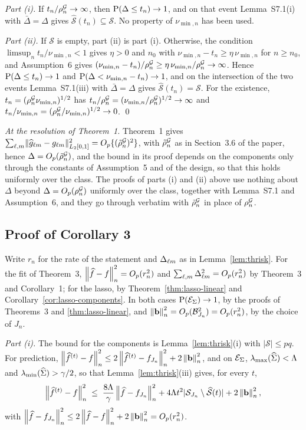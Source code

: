 \emph{Part (i).} If $t_n/\rho^{\mathcal{G}}_{n} \to \infty$, then $\mathrm{P}(\Delta \le t_n) \to 1$,
and on that event Lemma~S7.1(i) with $\bar{\Delta} = \Delta$ gives
$\widehat{\mathcal{S}}(t_n) \subseteq \mathcal{S}$. No property of
$\nu_{\min,n}$ has been used.

\emph{Part (ii).} If $\mathcal{S}$ is empty, part (ii) is part (i). Otherwise,
the condition $\limsup_n t_n/\nu_{\min,n} < 1$ gives $\eta > 0$ and $n_0$ with
$\nu_{\min,n} - t_n \ge \eta\,\nu_{\min,n}$ for $n \ge n_0$, and Assumption~6
gives $(\nu_{\min,n} - t_n)/\rho^{\mathcal{G}}_{n} \ge \eta\,\nu_{\min,n}/\rho^{\mathcal{G}}_{n} \to \infty$.
Hence $\mathrm{P}(\Delta \le t_n) \to 1$ and
$\mathrm{P}(\Delta < \nu_{\min,n} - t_n) \to 1$, and on the intersection of the two
events Lemma~S7.1(iii) with $\bar{\Delta} = \Delta$ gives
$\widehat{\mathcal{S}}(t_n) = \mathcal{S}$. For the existence,
$t_n = (\rho^{\mathcal{G}}_{n}\nu_{\min,n})^{1/2}$ has
$t_n/\rho^{\mathcal{G}}_{n} = (\nu_{\min,n}/\rho^{\mathcal{G}}_{n})^{1/2} \to \infty$ and
$t_n/\nu_{\min,n} = (\rho^{\mathcal{G}}_{n}/\nu_{\min,n})^{1/2} \to 0$. \qed

\emph{At the resolution of Theorem~1.} Theorem~1 gives
$\sum_{\ell,m}\lVert\widehat{g}_{\ell m}-g_{\ell m}\rVert^2_{L_2[0,1]}
= O_p\{(\tilde{\rho}^{\mathcal{G}}_{n})^{2}\}$, with $\tilde{\rho}^{\mathcal{G}}_{n}$ as in Section~3.6 of the paper, hence
$\Delta = O_p(\tilde{\rho}^{\mathcal{G}}_{n})$, and the bound in its proof depends on the components
only through the constants of Assumption~5 and of the design, so that this
holds uniformly over the class. The proofs of parts (i) and (ii) above use
nothing about $\Delta$ beyond $\Delta = O_p(\rho^{\mathcal{G}}_{n})$ uniformly over the class,
together with Lemma~S7.1 and Assumption~6, and they go through verbatim with
$\tilde{\rho}^{\mathcal{G}}_{n}$ in place of $\rho^{\mathcal{G}}_{n}$.

\subsection*{Proof of Corollary 3}

Write $r_n$ for the rate of the statement and $\Delta_{\ell m}$ as in
Lemma~\ref{lem:thrisk}. For the fit of Theorem~3,
$\left\lVert \widehat{f}-f \right\rVert_{n}^{2} = O_p(r_n^{2})$ and
$\sum_{\ell,m}\Delta_{\ell m}^{2} = O_p(r_n^{2})$ by Theorem~3 and Corollary~1; for the
lasso, by Theorem~\ref{thm:lasso-linear} and
Corollary~\ref{cor:lasso-components}. In both cases
$\mathrm{P}(\mathcal{E}_{\Sigma}) \to 1$, by the proofs of Theorems~3 and \ref{thm:lasso-linear},
and $\left\lVert \mathbf{b} \right\rVert_{n}^{2} = O_p(\mathcal{B}_{J_n}^{2}) = O_p(r_n^{2})$, by the choice
of $J_n$.

\emph{Part (i).} The bound for the components is Lemma~\ref{lem:thrisk}(i)
with $|\mathcal{S}| \le pq$. For prediction,
$\left\lVert \widehat{f}^{(t)}-f \right\rVert_{n}^{2} \le 2\left\lVert \widehat{f}^{(t)}-f_{J_n} \right\rVert_{n}^{2} +
2\left\lVert \mathbf{b} \right\rVert_{n}^{2}$, and on $\mathcal{E}_{\Sigma}$, $\lambda_{\max}(\widehat{\Sigma}) < \Lambda$ and
$\lambda_{\min}(\widehat{\Sigma}) > \gamma/2$, so that Lemma~\ref{lem:thrisk}(iii) gives, for
every $t$,
\[
  \left\lVert \widehat{f}^{(t)}-f \right\rVert_{n}^{2} \;\le\;
  \frac{8\Lambda}{\gamma}\left\lVert \widehat{f}-f_{J_n} \right\rVert_{n}^{2}
  + 4\Lambda t^{2}|\mathcal{S}_{J_n}\setminus\widehat{\mathcal{S}}(t)|
  + 2\left\lVert \mathbf{b} \right\rVert_{n}^{2},
\]
with $\left\lVert \widehat{f}-f_{J_n} \right\rVert_{n}^{2} \le 2\left\lVert \widehat{f}-f \right\rVert_{n}^{2} +
2\left\lVert \mathbf{b} \right\rVert_{n}^{2} = O_p(r_n^{2})$.

